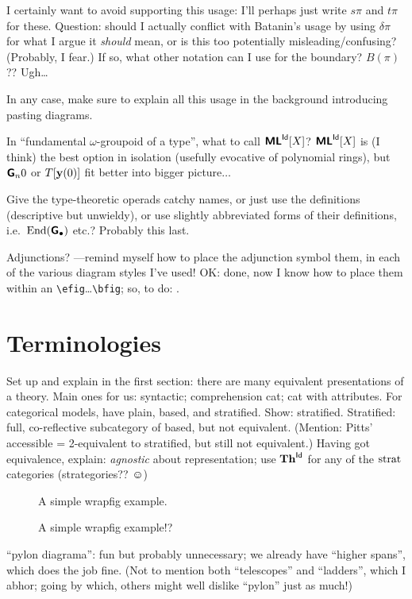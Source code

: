 \documentclass{amsart}
\begin{document}
I certainly want to avoid supporting this usage: I'll perhaps just write $s\pi$ and $t\pi$ for these.  Question: should I actually conflict with Batanin's usage by using $\delta \pi$ for what I argue it \emph{should} mean, or is this too potentially misleading/confusing?  (Probably, I fear.)  If so, what other notation can I use for the boundary?  $B(\pi)$??  Ugh\ldots

In any case, make sure to explain all this usage in the background introducing pasting diagrams.

\para In ``fundamental $\omega$-groupoid of a type'', what to call $\textsf{\textbf{ML}}^{\mathsf{Id}}[X]$?  $\textsf{\textbf{ML}}^{\mathsf{Id}}[X]$ is (I think) the best option in isolation (usefully evocative of polynomial rings), but $\textsf{\textbf{G}}_{n}{0}$ or $\\T[\mathbf{y}(0)]$ fit better into bigger picture$\ldots$

\para Give the type-theoretic operads catchy names, or just use the definitions (descriptive but unwieldy), or use slightly abbreviated forms of their definitions, i.e.\ $\mathrm{End}(\textsf{\textbf{G}}_\bullet)$ etc.?  Probably this last.

\para Adjunctions? ---remind myself how to place the adjunction symbol them, in each of the various diagram styles I've used!  OK: done, now I know how to place them within an \verb|\efig|\ldots\verb|\bfig|; so, to do: . 

\section{Terminologies}

\para Set up and explain in the first section: there are many equivalent presentations of a theory.  Main ones for us: syntactic; comprehension cat; cat with attributes.  For categorical models, have plain, based, and stratified.  Show: stratified.  Stratified: full, co-reflective subcategory of based, but not equivalent.  (Mention: Pitts' accessible = 2-equivalent to stratified, but still not equivalent.)  Having got equivalence, explain: \emph{agnostic} about representation; use $\mathbf{Th}^{\mathsf{Id}}$ for any of the $\textrm{strat}$ categories (strategories?? $\smiley$)

\begin{wrapfigure}{r}{0.4\textwidth}
A simple wrapfig example.
\caption{A simple wrapfig example!?}
\end{wrapfigure}

\para ``pylon diagrama'': fun but probably unnecessary; we already have ``higher spans'', which does the job fine. (Not to mention both ``telescopes'' and ``ladders'', which I abhor; going by which, others might well dislike ``pylon'' just as much!)
\end{document}
